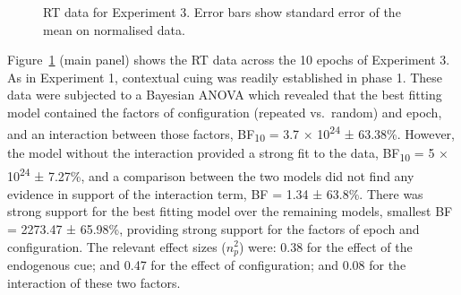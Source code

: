 \documentclass[
  man,
  floatsintext,
  longtable,
  nolmodern,
  notxfonts,
  notimes,
  colorlinks=true,linkcolor=blue,citecolor=blue,urlcolor=blue]{apa7}
\begin{document}
\begin{figure}[H]

\caption{\label{fig-RT-exp3}RT data for Experiment 3. Error bars show
standard error of the mean on normalised data.}


\end{figure}%

Figure~\ref{fig-RT-exp3} (main panel) shows the RT data across the 10
epochs of Experiment 3. As in Experiment 1, contextual cuing was readily
established in phase 1. These data were subjected to a Bayesian ANOVA
which revealed that the best fitting model contained the factors of
configuration (repeated vs.~random) and epoch, and an interaction
between those factors, BF\textsubscript{10} = 3.7 ×
10\textsuperscript{24} ± 63.38\%. However, the model without the
interaction provided a strong fit to the data, BF\textsubscript{10} = 5
× 10\textsuperscript{24} ± 7.27\%, and a comparison between the two
models did not find any evidence in support of the interaction term, BF
= 1.34 ± 63.8\%. There was strong support for the best fitting model
over the remaining models, smallest BF = 2273.47 ± 65.98\%, providing
strong support for the factors of epoch and configuration. The relevant
effect sizes (\(n^2_p\)) were: 0.38 for the effect of the endogenous
cue; and 0.47 for the effect of configuration; and 0.08 for the
interaction of these two factors.
\end{document}
